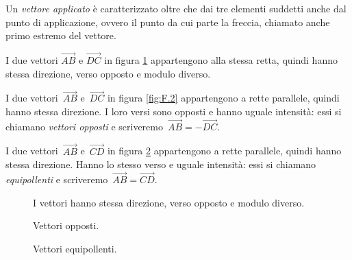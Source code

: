 Un \emph{vettore applicato} è caratterizzato oltre che dai tre elementi 
suddetti anche dal punto di applicazione,
ovvero il punto da cui parte la freccia, chiamato anche primo estremo del 
vettore.

\begin{esempio}
I due vettori \(\overrightarrow{AB}\) e \(\overrightarrow{DC}\) in 
figura 
\ref{fig:F.1} appartengono alla stessa retta, quindi hanno stessa direzione, 
verso opposto e modulo diverso.
\end{esempio}

\begin{esempio}
I due vettori~\(\overrightarrow{AB}\) e~\(\overrightarrow{DC}\) in figura 
\ref{fig:F.2} appartengono a rette parallele, quindi hanno stessa direzione. I 
loro versi sono opposti e hanno
uguale intensità: essi si chiamano \emph{vettori opposti} e 
scriveremo~\(\overrightarrow{AB}=-\overrightarrow{DC}\).
\end{esempio}

\begin{esempio}
I due vettori~\(\overrightarrow{AB}\) e~\(\overrightarrow{CD}\) in figura 
\ref{fig:F.3} appartengono a rette parallele, quindi hanno stessa direzione. 
Hanno lo stesso verso e uguale intensità:
essi si chiamano \emph{equipollenti} e 
scriveremo~\(\overrightarrow{AB}=\overrightarrow{CD}\).
\end{esempio}

\begin{inaccessibleblock}
 \begin{figure}[b]
\centering
\scalebox{.9}{}
\caption{I vettori hanno stessa direzione, verso opposto e modulo 
diverso.}\label{fig:F.1}
\end{figure}
\end{inaccessibleblock}

 \begin{inaccessibleblock}
 \begin{figure}[t]
\begin{minipage}{0.45\textwidth}
\centering
\scalebox{.9}{}
\caption{Vettori opposti.}\label{fig:F.2}
\end{minipage}\hfil
\begin{minipage}{0.45\textwidth}
\centering
\scalebox{.9}{}
\caption{Vettori equipollenti.}\label{fig:F.3}
\end{minipage}
\end{figure}
\end{inaccessibleblock}

